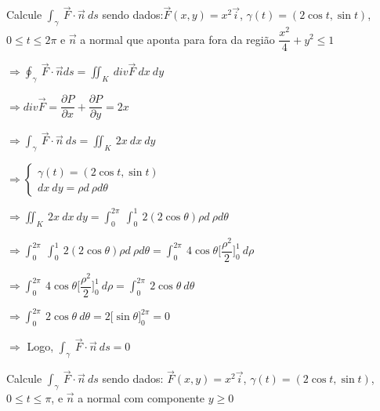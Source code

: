 \documentclass[11pt,a4paper]{article}
\begin{document}
\begin{enumerate}
{{		%
		\item Calcule $\displaystyle\int_\gamma\ \vec{F} \cdot \vec{n}\ ds$ sendo dados:$\vec{F}(x,y) = x^2\vec{i}$, $\gamma(t) = (2\cos t, \sin t)$, $0 \leq t \leq 2\pi$ e $\vec{n}$ a normal que aponta para fora da região $\dfrac{x^2}{4} + y^2 \leq 1$
		
		$\Rightarrow \displaystyle\oint_\gamma\ \vec{F}\cdot \vec{n}ds = \displaystyle\iint_K\ div\vec{F}\ dx\ dy$
		
		$\Rightarrow div \vec{F} = \dfrac{\partial P}{\partial x} + \dfrac{\partial P}{\partial y} = 2x$
		
		$\Rightarrow \displaystyle\int_\gamma\ \vec{F} \cdot \vec{n}\ ds = \displaystyle\iint_K\ 2x\ dx\ dy$ 
		
		$\Rightarrow \begin{cases}
		\gamma(t) = (2\cos t, \sin t) \\
		dx\ dy = \rho d\ \rho d\theta
		\end{cases}$
		
		$\Rightarrow \displaystyle\iint_K\ 2x\ dx\ dy = \displaystyle\int_{0}^{2\pi}\ \displaystyle\int_{0}^{1}\ 2(2\cos \theta)\rho d\ \rho d\theta$
		
		$\Rightarrow \displaystyle\int_{0}^{2\pi}\ \displaystyle\int_{0}^{1}\ 2(2\cos \theta)\rho d\ \rho d\theta = \displaystyle\int_{0}^{2\pi}\ 4\cos\theta\Bigg[\dfrac{\rho^2}{2}\Bigg]_0^1\ d\rho$
		
		$\Rightarrow \displaystyle\int_{0}^{2\pi}\ 4\cos\theta\Bigg[\dfrac{\rho^2}{2}\Bigg]_0^1\ d\rho = \displaystyle\int_{0}^{2\pi}\ 2\cos\theta\ d\theta$
		
		$\Rightarrow \displaystyle\int_{0}^{2\pi}\ 2\cos\theta\ d\theta = 2\Big[\sin\theta\Big]_0^{2\pi} = 0  $
		
		$\Rightarrow$ Logo, $\displaystyle\int_\gamma\ \vec{F} \cdot \vec{n}\ ds = 0$	
		\item Calcule $\displaystyle\int_\gamma\ \vec{F} \cdot \vec{n}\ ds$ sendo dados: $\vec{F}(x,y) = x^2\vec{i}$, $\gamma(t) = (2\cos t, \sin t)$, $0 \leq t \leq \pi$, e $\vec{n}$ a normal com componente $y \geq 0$
		
}}
\end{enumerate}
\end{document}
